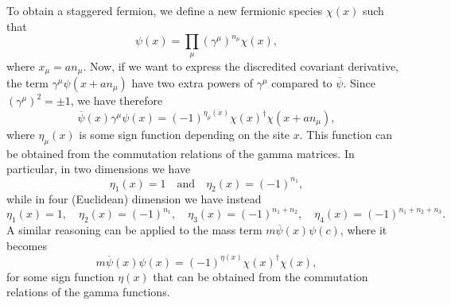 To obtain a staggered fermion, we define a new fermionic species $\chi(x)$ such that
\begin{equation}
    \psi(x) = \prod_{\mu} (\gamma^{\mu})^{n_{\mu}} \chi(x),
\end{equation}
where $x_{\mu} = an_{\mu}$.
Now, if we want to express the discredited covariant derivative, the term $\gamma^{\mu} \psi(x+a n_{\mu})$ have two extra powers of $\gamma^{\mu}$ compared to $\overline{\psi}$.
Since $(\gamma^{\mu})^2 = \pm 1$, we have therefore
\begin{equation}
    \overline{\psi}(x) \gamma^{\mu} \psi(x) = (-1)^{\eta_{\mu}(x)} \chi(x)^{\dagger} \chi(x + a n_{\mu}),
\end{equation}
where $\eta_{\mu}(x)$ is some sign function depending on the site $x$.
This function can be obtained from the commutation relations of the gamma matrices.
In particular, in two dimensions we have
\begin{equation}
    \eta_1(x) = 1
    \quad \text{and} \quad
    \eta_2(x) = (-1)^{n_1},
\end{equation}
while in four (Euclidean) dimension we have instead \cite{tong2018gauge}
\begin{equation}
    \eta_1(x) = 1, \quad
    \eta_2(x) = (-1)^{n_1}, \quad
    \eta_3(x) = (-1)^{n_1 + n_2}, \quad
    \eta_4(x) = (-1)^{n_1 + n_2 + n_3}.
\end{equation}
A similar reasoning can be applied to the mass term $m \overline{\psi}(x) \psi(c)$, where it becomes
\begin{equation}
    m \overline{\psi}(x) \psi(x) = (-1)^{\eta(x)} \chi(x)^{\dagger} \chi(x),
\end{equation}
for some sign function $\eta(x)$ that can be obtained from the commutation relations of the gamma functions.
